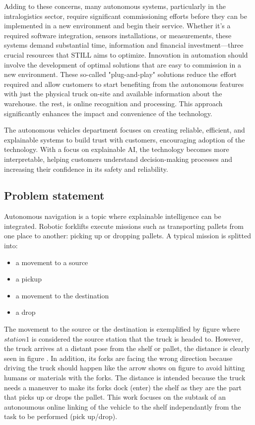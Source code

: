 Adding to these concerns, many autonomous systems, particularly in the intralogistics 
sector, require significant commissioning efforts before they can be implemented in 
a new environment and begin their service. Whether it's a required software integration, 
sensors installations, or 
measurements, these systems demand substantial time, information and financial investment—three 
crucial resources that STILL aims to optimize. Innovation in automation should involve 
the development of optimal solutions that are easy to 
commission in a new environment. These so-called "plug-and-play" solutions reduce 
the effort required and allow customers to start benefiting from the autonomous 
features with just the physical truck on-site and available information about the 
warehouse. the rest, is online recognition and processing. This approach 
significantly enhances the impact and convenience of the technology. 

The autonomous vehicles department focuses on creating reliable, efficient, and 
explainable systems to build trust with customers, encouraging adoption of the technology. 
With a focus on explainable AI, the technology becomes more interpretable, helping customers 
understand decision-making processes and increasing their confidence in its safety and reliability.

\subsection{Problem statement}

Autonomous navigation is a topic where explainable intelligence can be integrated. 
Robotic forklifts execute missions such as transporting pallets from one place to another: 
picking up or dropping pallets.
A typical mission is splitted into:
\begin{itemize}
    \item a movement to a source
    \item a pickup
    \item a movement to the destination
    \item a drop
\end{itemize}
The movement to the source or the destination is exemplified by figure  where 
\(station1\) is considered the source station that the truck is headed to.
However, the truck arrives at a distant pose from the shelf or pallet,
the distance is clearly seen in figure . In addition, its forks are facing the 
wrong direction because driving the truck should happen like the arrow shows on figure  
to avoid hitting humans or materials with the forks.
The distance is intended because the truck needs a maneuver to make its forks dock (enter) the shelf
as they are the part that picks up or drops the pallet.
This work focuses on the subtask of an autonoumous online linking of the vehicle to the shelf
independantly from the task to be performed (pick up/drop). 

